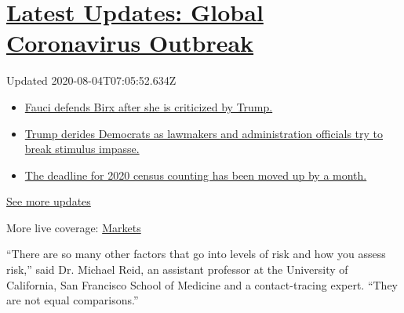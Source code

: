 \hypertarget{latest-updates-global-coronavirus-outbreak}{%
\section{\texorpdfstring{\href{https://www.nytimes3xbfgragh.onion/2020/08/03/world/coronavirus-covid-19.html?action=click\&pgtype=Article\&state=default\&region=MAIN_CONTENT_1\&context=storylines_live_updates}{Latest
Updates: Global Coronavirus
Outbreak}}{Latest Updates: Global Coronavirus Outbreak}}\label{latest-updates-global-coronavirus-outbreak}}

Updated 2020-08-04T07:05:52.634Z

\begin{itemize}
\tightlist
\item
  \href{https://www.nytimes3xbfgragh.onion/2020/08/03/world/coronavirus-covid-19.html?action=click\&pgtype=Article\&state=default\&region=MAIN_CONTENT_1\&context=storylines_live_updates\#link-4547638f}{Fauci
  defends Birx after she is criticized by Trump.}
\item
  \href{https://www.nytimes3xbfgragh.onion/2020/08/03/world/coronavirus-covid-19.html?action=click\&pgtype=Article\&state=default\&region=MAIN_CONTENT_1\&context=storylines_live_updates\#link-15e7f995}{Trump
  derides Democrats as lawmakers and administration officials try to
  break stimulus impasse.}
\item
  \href{https://www.nytimes3xbfgragh.onion/2020/08/03/world/coronavirus-covid-19.html?action=click\&pgtype=Article\&state=default\&region=MAIN_CONTENT_1\&context=storylines_live_updates\#link-e5a2cda}{The
  deadline for 2020 census counting has been moved up by a month.}
\end{itemize}

\href{https://www.nytimes3xbfgragh.onion/2020/08/03/world/coronavirus-covid-19.html?action=click\&pgtype=Article\&state=default\&region=MAIN_CONTENT_1\&context=storylines_live_updates}{See
more updates}

More live coverage:
\href{https://www.nytimes3xbfgragh.onion/live/2020/08/03/business/stock-market-today-coronavirus?action=click\&pgtype=Article\&state=default\&region=MAIN_CONTENT_1\&context=storylines_live_updates}{Markets}

``There are so many other factors that go into levels of risk and how
you assess risk,'' said Dr. Michael Reid, an assistant professor at the
University of California, San Francisco School of Medicine and a
contact-tracing expert. ``They are not equal comparisons.''

